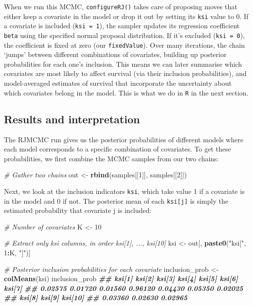 \documentclass[
  12pt,
]{krantz}
\newenvironment{Shaded}{\begin{snugshade}}{\end{snugshade}}
\newcommand{\CommentTok}[1]{\textcolor[rgb]{0.56,0.35,0.01}{\textit{#1}}}
\newcommand{\DecValTok}[1]{\textcolor[rgb]{0.00,0.00,0.81}{#1}}
\newcommand{\DocumentationTok}[1]{\textcolor[rgb]{0.56,0.35,0.01}{\textbf{\textit{#1}}}}
\newcommand{\FunctionTok}[1]{\textcolor[rgb]{0.13,0.29,0.53}{\textbf{#1}}}
\newcommand{\NormalTok}[1]{#1}
\newcommand{\OtherTok}[1]{\textcolor[rgb]{0.56,0.35,0.01}{#1}}
\newcommand{\SpecialCharTok}[1]{\textcolor[rgb]{0.81,0.36,0.00}{\textbf{#1}}}
\newcommand{\StringTok}[1]{\textcolor[rgb]{0.31,0.60,0.02}{#1}}
\begin{document}
When we run this MCMC, \texttt{configureRJ()} takes care of proposing moves that either keep a covariate in the model or drop it out by setting its \texttt{ksi} value to 0. If a covariate is included (\texttt{ksi\ =\ 1}), the sampler updates its regression coefficient \texttt{beta} using the specified normal proposal distribution. If it's excluded (\texttt{ksi\ =\ 0}), the coefficient is fixed at zero (our \texttt{fixedValue}). Over many iterations, the chain `jumps' between different combinations of covariates, building up posterior probabilities for each one's inclusion. This means we can later summarise which covariates are most likely to affect survival (via their inclusion probabilities), and model-averaged estimates of survival that incorporate the uncertainty about which covariates belong in the model. This is what we do in \texttt{R} in the next section.

\subsection{Results and interpretation}\label{results-and-interpretation}

The RJMCMC run gives us the posterior probabilities of different models where each model corresponds to a specific combination of covariates. To get these probabilities, we first combine the MCMC samples from our two chains:

\begin{Shaded}
\begin{Highlighting}[]
\CommentTok{\# Gather two chains}
\NormalTok{out }\OtherTok{\textless{}{-}} \FunctionTok{rbind}\NormalTok{(samples[[}\DecValTok{1}\NormalTok{]], samples[[}\DecValTok{2}\NormalTok{]])}
\end{Highlighting}
\end{Shaded}

Next, we look at the inclusion indicators \texttt{ksi}, which take value 1 if a covariate is in the model and 0 if not. The posterior mean of each \texttt{ksi{[}j{]}} is simply the estimated probability that covariate j is included:

\begin{Shaded}
\begin{Highlighting}[]
\CommentTok{\# Number of covariates}
\NormalTok{K }\OtherTok{\textless{}{-}} \DecValTok{10}

\CommentTok{\# Extract only ksi columns, in order ksi[1], ..., ksi[10]}
\NormalTok{ksi }\OtherTok{\textless{}{-}}\NormalTok{ out[, }\FunctionTok{paste0}\NormalTok{(}\StringTok{"ksi["}\NormalTok{, }\DecValTok{1}\SpecialCharTok{:}\NormalTok{K, }\StringTok{"]"}\NormalTok{)]}

\CommentTok{\# Posterior inclusion probabilities for each covariate}
\NormalTok{inclusion\_prob }\OtherTok{\textless{}{-}} \FunctionTok{colMeans}\NormalTok{(ksi)}
\NormalTok{inclusion\_prob}
\DocumentationTok{\#\#  ksi[1]  ksi[2]  ksi[3]  ksi[4]  ksi[5]  ksi[6]  ksi[7] }
\DocumentationTok{\#\# 0.02575 0.01720 0.01560 0.96120 0.04430 0.05350 0.02025 }
\DocumentationTok{\#\#  ksi[8]  ksi[9] ksi[10] }
\DocumentationTok{\#\# 0.03360 0.02630 0.02965}
\end{Highlighting}
\end{Shaded}
\end{document}
